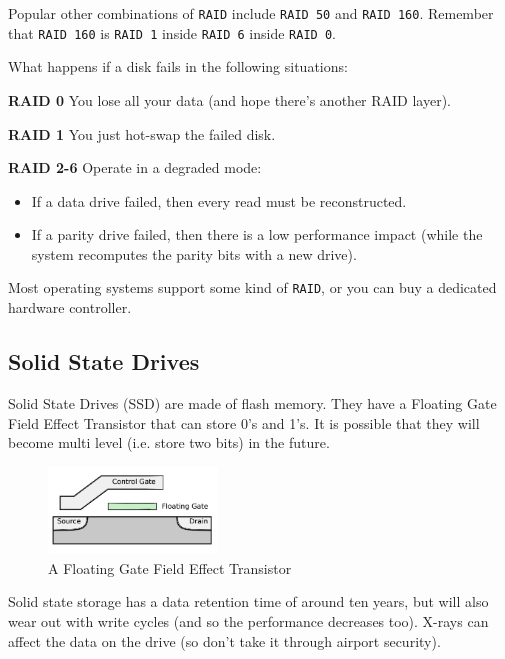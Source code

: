 Popular other combinations of \texttt{RAID} include \texttt{RAID 50} and
\texttt{RAID 160}. Remember that \texttt{RAID 160} is \texttt{RAID 1} inside
\texttt{RAID 6} inside \texttt{RAID 0}.

What happens if a disk fails in the following situations:

\begin{description}
  \item \textbf{RAID 0} You lose all your data (and hope there's another RAID
    layer).
  \item \textbf{RAID 1} You just hot-swap the failed disk.
  \item \textbf{RAID 2-6} Operate in a degraded mode:
    \begin{itemize}
      \item If a data drive failed, then every read must be reconstructed.
      \item If a parity drive failed, then there is a low performance impact
        (while the system recomputes the parity bits with a new drive).
    \end{itemize}
\end{description}

Most operating systems support some kind of \texttt{RAID}, or you can buy a
dedicated hardware controller.

\subsection{Solid State Drives}

Solid State Drives (SSD) are made of flash memory. They have a Floating Gate
Field Effect Transistor that can store 0's and 1's. It is possible that they
will become multi level (i.e. store two bits) in the future.

\begin{figure}[H]
  \centering
  \includegraphics[width=0.4\textwidth]{images/fgfet}
  \caption{A Floating Gate Field Effect Transistor}
  \label{fgfet}
\end{figure}

Solid state storage has a data retention time of around ten years, but will also
wear out with write cycles (and so the performance decreases too). X-rays can
affect the data on the drive (so don't take it through airport security).

